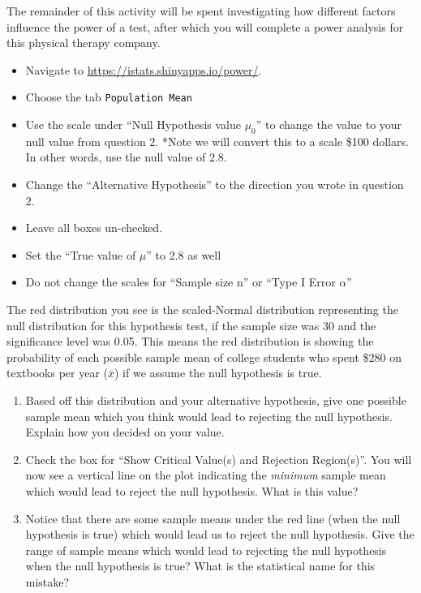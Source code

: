 \documentclass[
]{report}
\begin{document}
The remainder of this activity will be spent investigating how different factors influence the power of a test, after which you will complete a power analysis for this physical therapy company.

\begin{itemize}
\item
  Navigate to \url{https://istats.shinyapps.io/power/}.
\item
  Choose the tab \texttt{Population\ Mean}
\item
  Use the scale under ``Null Hypothesis value \(\mu_0\)'' to change the value to your null value from question 2. *Note we will convert this to a scale \$100 dollars. In other words, use the null value of 2.8.
\item
  Change the ``Alternative Hypothesis'' to the direction you wrote in question 2.
\item
  Leave all boxes un-checked.
\item
  Set the ``True value of \(\mu\)'' to 2.8 as well
\item
  Do not change the scales for ``Sample size n'' or ``Type I Error \(\alpha\)''
\end{itemize}

The red distribution you see is the scaled-Normal distribution representing the null distribution for this hypothesis test, if the sample size was 30 and the significance level was 0.05. This means the red distribution is showing the probability of each possible sample mean of college students who spent \$280 on textbooks per year (\(\bar{x}\)) if we assume the null hypothesis is true.

\begin{enumerate}
\def\labelenumi{\arabic{enumi}.}
\setcounter{enumi}{2}
\item
  Based off this distribution and your alternative hypothesis, give one possible sample mean which you think would lead to rejecting the null hypothesis. Explain how you decided on your value.
  \vspace{0.25in}
\item
  Check the box for ``Show Critical Value(s) and Rejection Region(s)''. You will now see a vertical line on the plot indicating the \emph{minimum} sample mean which would lead to reject the null hypothesis. What is this value?\\
  \vspace{0.25in}
\item
  Notice that there are some sample means under the red line (when the null hypothesis is true) which would lead us to reject the null hypothesis. Give the range of sample means which would lead to rejecting the null hypothesis when the null hypothesis is true? What is the statistical name for this mistake?
  \vspace{0.4in}
\end{enumerate}
\end{document}
